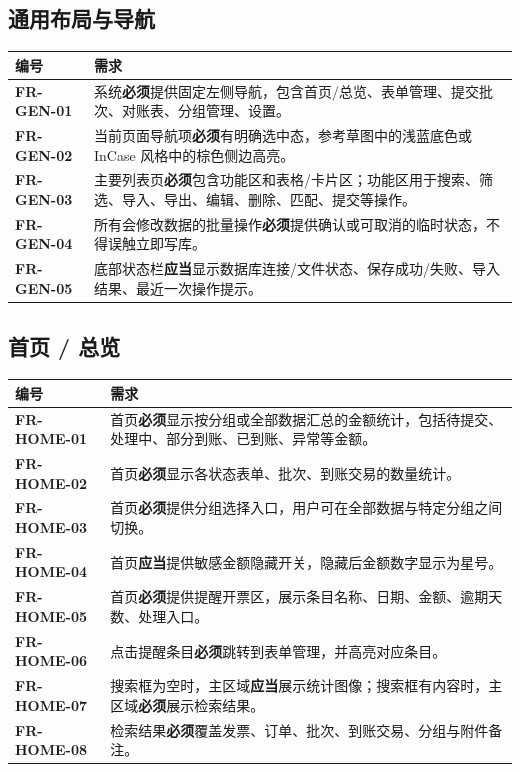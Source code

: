\documentclass[UTF8,zihao=-4]{ctexart}
\newcommand{\req}[1]{\textbf{\textcolor{ivicBrown}{#1}}}
\newcommand{\must}{\textbf{必须}}
\newcommand{\should}{\textbf{应当}}
\begin{document}
\subsection{通用布局与导航}

\begin{longtable}{p{2.8cm}p{11.6cm}}
\toprule
编号 & 需求 \\
\midrule
\req{FR-GEN-01} & 系统\must{}提供固定左侧导航，包含首页/总览、表单管理、提交批次、对账表、分组管理、设置。 \\
\req{FR-GEN-02} & 当前页面导航项\must{}有明确选中态，参考草图中的浅蓝底色或 InCase 风格中的棕色侧边高亮。 \\
\req{FR-GEN-03} & 主要列表页\must{}包含功能区和表格/卡片区；功能区用于搜索、筛选、导入、导出、编辑、删除、匹配、提交等操作。 \\
\req{FR-GEN-04} & 所有会修改数据的批量操作\must{}提供确认或可取消的临时状态，不得误触立即写库。 \\
\req{FR-GEN-05} & 底部状态栏\should{}显示数据库连接/文件状态、保存成功/失败、导入结果、最近一次操作提示。 \\
\bottomrule
\end{longtable}

\subsection{首页 / 总览}

\begin{longtable}{p{2.8cm}p{11.6cm}}
\toprule
编号 & 需求 \\
\midrule
\req{FR-HOME-01} & 首页\must{}显示按分组或全部数据汇总的金额统计，包括待提交、处理中、部分到账、已到账、异常等金额。 \\
\req{FR-HOME-02} & 首页\must{}显示各状态表单、批次、到账交易的数量统计。 \\
\req{FR-HOME-03} & 首页\must{}提供分组选择入口，用户可在全部数据与特定分组之间切换。 \\
\req{FR-HOME-04} & 首页\should{}提供敏感金额隐藏开关，隐藏后金额数字显示为星号。 \\
\req{FR-HOME-05} & 首页\must{}提供提醒开票区，展示条目名称、日期、金额、逾期天数、处理入口。 \\
\req{FR-HOME-06} & 点击提醒条目\must{}跳转到表单管理，并高亮对应条目。 \\
\req{FR-HOME-07} & 搜索框为空时，主区域\should{}展示统计图像；搜索框有内容时，主区域\must{}展示检索结果。 \\
\req{FR-HOME-08} & 检索结果\must{}覆盖发票、订单、批次、到账交易、分组与附件备注。 \\
\bottomrule
\end{longtable}
\end{document}

